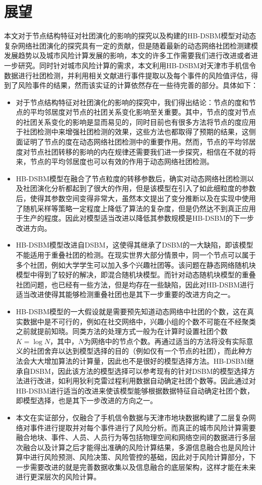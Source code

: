\section{展望}
本文对于节点结构特征对社团演化的影响的探究以及构建的HB-DSBM模型对动态复杂网络社团演化的探究具有一定的贡献，但是随着最新的动态网络社团检测建模发展趋势以及城市风险计算发展的影响，本文的许多工作需要我们进行改进或者进一步研究。同时针对城市风险计算的需求，本文利用HB-DSBM对天津市手机信令数据进行社团检测，并利用相关文献进行事件提取以及每个事件的风险值评估，得到了风险事件的结果，然而该实证的计算依然存在一些待完善的部分。具体如下：
\begin{itemize}
	
	\item 对于节点结构特征对社团演化的影响的探究中，我们得出结论：节点的度和节点的平均邻居度对节点的社团关系变化影响至关重要。其中，节点的度对节点的社团关系变化的影响是显而易见的，同时目前也有很多方法将节点的度应用于社团检测中来增强社团检测的效果，这些方法也都取得了预期的结果，这侧面证明了节点的度在动态网络社团检测中的重要作用。然而，节点的平均邻居度对节点社团转移的影响的内在规律还需要我们进一步探究，相信在不就的将来，节点的平均邻居度也可以有效的作用于动态网络社团检测。
	\item HB-DSBM模型在融合了节点粒度的转移参数后，确实对动态网络社团检测以及社团演化分析都起到了很大的作用，但是该模型在引入了如此细粒度的参数后，使得其参数空间变得非常大，虽然本文提出了变分推断以及在实现中使用了随机采样等策略一定程度上降低了算法的复杂度，但是仍然达不到真正应用于生产的程度。因此对模型适当改进以降低其参数规模是HB-DSBM的下一步改进方向。
	\item HB-DSBM模型改进自DSBM，这使得其继承了DSBM的一大缺陷，即该模型不能适用于重叠社团的检测。在现实世界大部分情景中，同一个节点可以属于多个社团，例如大学学生可以加入多个兴趣社团等。该问题在静态网络随机块模型中得到了较好的解决，即混合随机块模型。而针对动态随机块模型的重叠社团问题，也已经有一些方法，但是均存在一些缺陷，因此对HB-DSBM进行适当改进使得其能够检测重叠社团也是其下一步重要的改进方向之一。
	\item HB-DSBM模型的一大假设就是需要预先知道动态网络中社团的个数，这在真实数据中是不可行的，例如在社交网络中，兴趣小组的个数不可能在不经聚类之前就提前知晓。同类方法的处理方式一般为在计算时设置社团个数$K=\log N$，其中，$N$为网络中的节点个数。再通过适当的方法将没有实际意义的社团舍弃以达到模型选择的目的（例如仅有一个节点的社团），而此种方法会大大增加算法的计算量，因此也不是很好的模型选择方法。HB-DSBM继承自DSBM，因此该方法的模型选择可以参考现有的针对DSBM的模型选择方法进行改进，如利用狄利克雷过程利用数据自动确定社团个数等。因此通过对HB-DSBM进行适当的改进来使该模型能够根据数据特征自动确定社团个数，即模型选择，也是其下一步改进的方向之一。
	\item 本文在实证部分，仅融合了手机信令数据与天津市地块数据构建了二层复杂网络对事件进行提取并对每个事件进行了风险分析。而真正的城市风险计算需要融合地块、事件、人员、人员行为等包括物理空间和网络空间的数据进行多层次融合以及计算之后才能得出准确的风险计算结果，多源信息融合也是风险计算中进行风险预测、风险决策、风险管控的基础，因此对于风险计算部分，下一步需要改进的就是完善数据收集以及信息融合的底层架构，这样才能在未来进行更深层次的风险计算。
\end{itemize}
